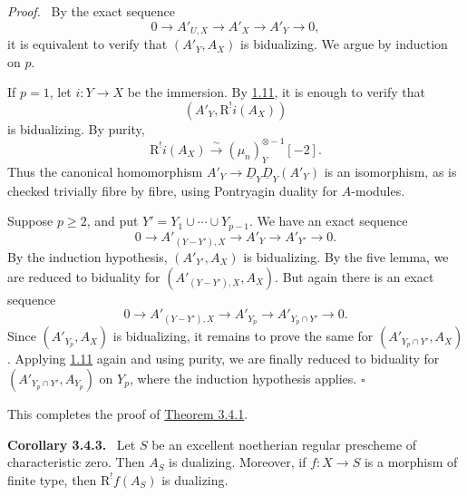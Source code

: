 \documentclass[11pt]{article}
\providecommand{\qedtext}{\hfill$\square$}
\newenvironment{statement}[1]{\par\medskip\noindent\textbf{#1.}\ }{\par\medskip}
\newenvironment{prooftext}[1][Proof]{\par\noindent\emph{#1.}\ }{\par\medskip}
\newcommand{\R}{\mathrm{R}}
\providecommand{\R}{\mathrm R}
\providecommand{\qedtext}{\hfill$\square$}
\begin{document}
\begin{prooftext}
By the exact sequence
\[
   0\longrightarrow A'_{U,X}\longrightarrow A'_X\longrightarrow A'_Y\longrightarrow0,
\]
it is equivalent to verify that $(A'_Y,A_X)$ is bidualizing. We argue by induction on $p$.

If $p=1$, let $i:Y\to X$ be the immersion. By \hyperref[sga5:I:proposition:1.11]{1.11}, it is enough to verify that
\[
   (A'_Y,\R^!i(A_X))
\]
is bidualizing. By purity,
\[
   \R^!i(A_X)\xrightarrow{\sim}(\mu_n)^{\otimes -1}_Y[-2].
\]
Thus the canonical homomorphism $A'_Y\to\underline D_Y\underline D_Y(A'_Y)$ is an isomorphism, as is checked trivially fibre by fibre, using Pontryagin duality for $A$-modules.

Suppose $p\ge2$, and put $Y'=Y_1\cup\cdots\cup Y_{p-1}$. We have an exact sequence
\[
   0\longrightarrow A'_{(Y-Y'),X}\longrightarrow A'_Y\longrightarrow A'_{Y'}\longrightarrow0.
\]
By the induction hypothesis, $(A'_{Y'},A_X)$ is bidualizing. By the five lemma, we are reduced to biduality for $(A'_{(Y-Y'),X},A_X)$. But again there is an exact sequence
\[
   0\longrightarrow A'_{(Y-Y'),X}\longrightarrow A'_{Y_p}\longrightarrow A'_{Y_p\cap Y'}\longrightarrow0.
\]
Since $(A'_{Y_p},A_X)$ is bidualizing, it remains to prove the same for $(A'_{Y_p\cap Y'},A_X)$. Applying \hyperref[sga5:I:proposition:1.11]{1.11} again and using purity, we are finally reduced to biduality for $(A'_{Y_p\cap Y'},A_{Y_p})$ on $Y_p$, where the induction hypothesis applies. \qedtext
\end{prooftext}

This completes the proof of \hyperref[sga5:I:theorem:3.4.1]{Theorem 3.4.1}.

\label{sga5:I:corollary:3.4.3}\begin{statement}{Corollary 3.4.3}
Let $S$ be an excellent noetherian regular prescheme of characteristic zero. Then $A_S$ is dualizing. Moreover, if $f:X\to S$ is a morphism of finite type, then $\R^!f(A_S)$ is dualizing.
\end{statement}
\end{document}
